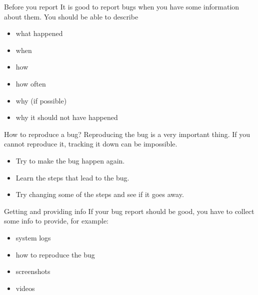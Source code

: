 \documentclass[12pt]{beamer}
\begin{document}
\begin{frame}{Before you report}
It is good to report bugs when you have some information about them. You should be able to describe

\begin{itemize}
	\item what happened
	\item when 
	\item how 
	\item how often
	\item why (if possible)
	\item why it should not have happened
\end{itemize}	
\end{frame}

\begin{frame}{How to reproduce a bug?}
	Reproducing the bug is a very important thing. If you cannot reproduce it, tracking it down can be impossible.
	\begin{itemize}
		\item Try to make the bug happen again.
		\item Learn the steps that lead to the bug.
		\item Try changing some of the steps and see if it goes away.
	\end{itemize}
\end{frame}

\begin{frame}{Getting and providing info}
If your bug report should be good, you have to collect some info to provide, for example:
\begin{itemize}
	\item system logs
	\item how to reproduce the bug
	\item screenshots
	\item videos
\end{itemize}
\end{frame}
\end{document}
